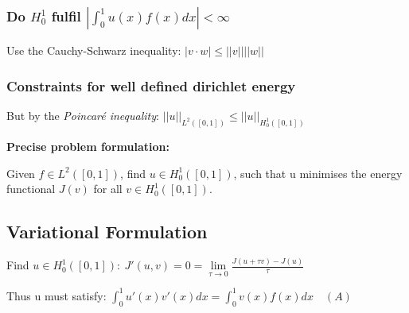 \documentclass[10pt,a4paper]{scrartcl}
\begin{document}
\begin{multicols*}{3}

\subsubsection*{Do $H_0^1$ fulfil $\left|\int_0^1u(x)f(x)dx\right|<\infty$}


Use the Cauchy-Schwarz inequality: $|v\cdot w|\leq||v||||w||$





\subsubsection*{Constraints for well defined dirichlet energy}


But by the \emph{Poincaré inequality}: $||u||_{L^2([0,1])}\leq||u||_{H_0^1([0,1])}$

\textbf{Precise problem formulation:}

Given $f\in L^2([0,1])$, find $u\in H_0^1([0,1])$, such that u minimises the energy functional $J(v)$ for all $v\in H_0^1([0,1])$.

\subsection{Variational Formulation}

Find $u\in H_0^1([0,1]):\ J'(u,v)=0=\lim\limits_{\tau\rightarrow 0}\frac{J(u+\tau v)-J(u)}{\tau}$

Thus u must satisfy: $\int_0^1u'(x)v'(x)dx=\int_0^1v(x)f(x)dx\quad (A)$

\note{

}
\end{multicols*}
\end{document}
